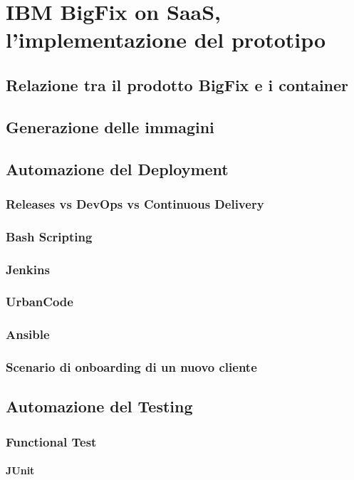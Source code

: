 \chapter{IBM BigFix on SaaS, l'implementazione del prototipo}

\section{Relazione tra il prodotto BigFix e i container}
\section{Generazione delle immagini}

\section{Automazione del Deployment}
\subsection{Releases vs DevOps vs Continuous Delivery}
\subsection{Bash Scripting}
\subsection{Jenkins}
\subsection{UrbanCode}
\subsection{Ansible}
\subsection{Scenario di onboarding di un nuovo cliente}

\section{Automazione del Testing}
\subsection{Functional Test}
\subsubsection{JUnit}
